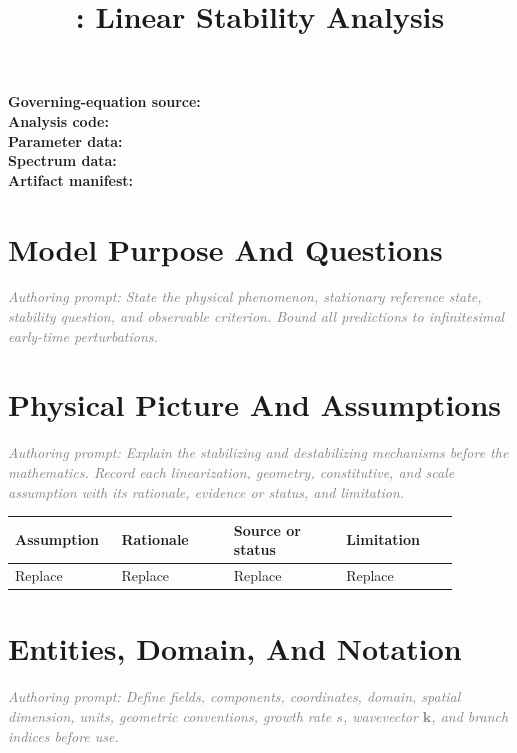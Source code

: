 \documentclass[11pt]{article}
\title{\modelname: Linear Stability Analysis}
\author{}
\date{}
\newcommand{\authorprompt}[1]{\textcolor{gray}{\emph{Authoring prompt: #1}}}
\newcommand{\vect}[1]{\bm{#1}}
\begin{document}
\maketitle

\noindent\textbf{Governing-equation source:} \\
\textbf{Analysis code:} \\
\textbf{Parameter data:} \\
\textbf{Spectrum data:} \\
\textbf{Artifact manifest:} 

\section{Model Purpose And Questions}

\authorprompt{State the physical phenomenon, stationary reference state, stability question, and observable criterion. Bound all predictions to infinitesimal early-time perturbations.}

\section{Physical Picture And Assumptions}

\authorprompt{Explain the stabilizing and destabilizing mechanisms before the mathematics. Record each linearization, geometry, constitutive, and scale assumption with its rationale, evidence or status, and limitation.}

\begin{center}
\begin{tabular}{p{0.19\linewidth}p{0.23\linewidth}p{0.23\linewidth}p{0.23\linewidth}}
\toprule
Assumption & Rationale & Source or status & Limitation \\
\midrule
Replace & Replace & Replace & Replace \\
\bottomrule
\end{tabular}
\end{center}

\section{Entities, Domain, And Notation}

\authorprompt{Define fields, components, coordinates, domain, spatial dimension, units, geometric conventions, growth rate $s$, wavevector $\vect{k}$, and branch indices before use.}
\end{document}
